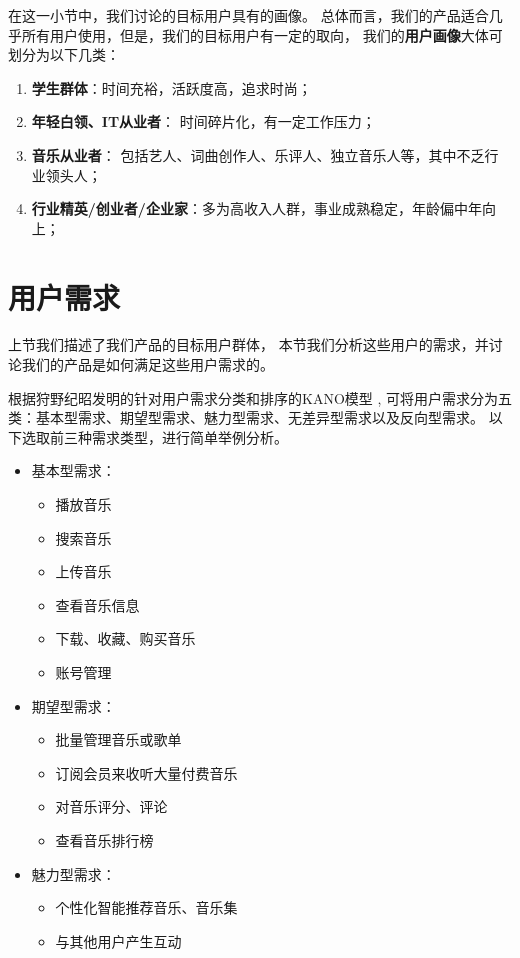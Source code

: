 在这一小节中，我们讨论\proname 的目标用户具有的画像。
总体而言，我们的产品适合几乎所有用户使用，但是，我们的目标用户有一定的取向，
我们的\textbf{用户画像}大体可划分为以下几类：
\begin{enumerate}
    \item \textbf{学生群体}：时间充裕，活跃度高，追求时尚；
    \item \textbf{年轻白领、IT从业者}：
    时间碎片化，有一定工作压力；
    \item \textbf{音乐从业者}：
    包括艺人、词曲创作人、乐评人、独立音乐人等，其中不乏行业领头人；
    \item \textbf{行业精英/创业者/企业家}：多为高收入人群，事业成熟稳定，年龄偏中年向上；
\end{enumerate}

\section{用户需求} %

上节我们描述了我们产品的目标用户群体， 
    本节我们分析这些用户的需求，并讨论我们的产品是如何满足这些用户需求的。

根据狩野纪昭发明的针对用户需求分类和排序的KANO模型
, 
    可将用户需求分为五类：基本型需求、期望型需求、魅力型需求、无差异型需求以及反向型需求。
    以下选取前三种需求类型，进行简单举例分析。

\begin{itemize}
    \item 基本型需求：
    \begin{itemize}
        \item 播放音乐
        \item 搜索音乐
        \item 上传音乐
        \item 查看音乐信息
        \item 下载、收藏、购买音乐
        \item 账号管理
    \end{itemize}
    \item 期望型需求：
    \begin{itemize}
        \item 批量管理音乐或歌单
        \item 订阅会员来收听大量付费音乐
        \item 对音乐评分、评论
        \item 查看音乐排行榜
    \end{itemize}
    \item 魅力型需求：
    \begin{itemize}
        \item 个性化智能推荐音乐、音乐集
        \item 与其他用户产生互动
    \end{itemize}
\end{itemize}
\iffalse
{}

